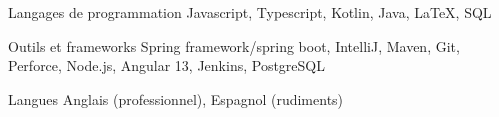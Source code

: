 
\begin{cvskills}

\cvskill
{Langages de programmation}
{Javascript, Typescript, Kotlin, Java, LaTeX, SQL}

\cvskill
{Outils et frameworks}
{Spring framework/spring boot, IntelliJ, Maven, Git, Perforce, Node.js, Angular 13, Jenkins, PostgreSQL}

\cvskill
{Langues}
{Anglais (professionnel), Espagnol (rudiments)}

\end{cvskills}
